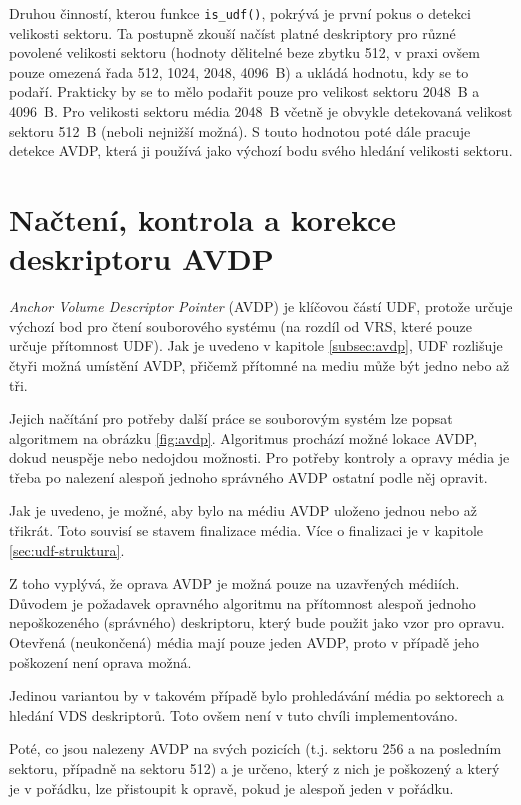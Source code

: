 Druhou činností, kterou funkce \texttt{is\_udf()}, pokrývá je první pokus o detekci velikosti sektoru. Ta postupně zkouší načíst platné deskriptory pro různé povolené velikosti sektoru (hodnoty dělitelné beze zbytku 512, v praxi ovšem pouze omezená řada 512, 1024, 2048, 4096~B) a ukládá hodnotu, kdy se to podaří. Prakticky by se to mělo podařit pouze pro velikost sektoru 2048~B a 4096~B. Pro velikosti sektoru média 2048~B včetně je obvykle detekovaná velikost sektoru 512~B (neboli nejnižší možná). S touto hodnotou poté dále pracuje detekce AVDP, která ji používá jako výchozí bodu svého hledání velikosti sektoru.

\section{Načtení, kontrola a korekce deskriptoru AVDP}
\label{sec:nacteni-a-oprava-avdp}
\textit{Anchor Volume Descriptor Pointer} (AVDP) je klíčovou částí UDF, protože určuje výchozí bod pro čtení souborového systému (na rozdíl od VRS, které pouze určuje přítomnost UDF). Jak je uvedeno v kapitole \ref{subsec:avdp}, UDF rozlišuje čtyři možná umístění AVDP, přičemž přítomné na mediu může být jedno nebo až tři.

Jejich načítání pro potřeby další práce se souborovým systém lze popsat algoritmem na obrázku \ref{fig:avdp}. Algoritmus prochází možné lokace AVDP, dokud neuspěje nebo nedojdou možnosti. Pro potřeby kontroly a opravy média je třeba po nalezení alespoň jednoho správného AVDP ostatní podle něj opravit.

Jak je uvedeno, je možné, aby bylo na médiu AVDP uloženo jednou nebo až třikrát. Toto souvisí se stavem finalizace média. Více o finalizaci je v kapitole \ref{sec:udf-struktura}.

Z toho vyplývá, že oprava AVDP je možná pouze na uzavřených médiích. Důvodem je požadavek opravného algoritmu na přítomnost alespoň jednoho nepoškozeného (správného) deskriptoru, který bude použit jako vzor pro opravu. Otevřená (neukončená) média mají pouze jeden AVDP, proto v případě jeho poškození není oprava možná.

Jedinou variantou by v takovém případě bylo prohledávání média po sektorech a hledání VDS deskriptorů. Toto ovšem není v tuto chvíli implementováno.

Poté, co jsou nalezeny AVDP na svých pozicích (t.j. sektoru 256 a na posledním sektoru, případně na sektoru 512) a je určeno, který z nich je poškozený a který je v pořádku, lze přistoupit k opravě, pokud je alespoň jeden v pořádku.


